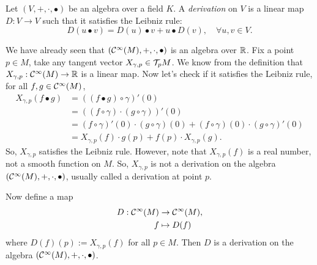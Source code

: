 \begin{definition}[Derivation]
	Let \((V, +, \cdot, \bullet)\) be an algebra over a field \(K\). A \emph{derivation} on \(V\) is a linear map \(D: V \to V\) such that it satisfies the Leibniz rule:
	\begin{equation}
		D(u \bullet v) = D(u) \bullet v + u \bullet D(v), \quad \forall u, v \in V.
	\end{equation}
\end{definition}
\begin{example}
	We have already seen that \((\mathcal C^\infty(M), +, \cdot, \bullet)\) is an algebra over \(\mathbb R\). Fix a point \(p \in M\), take any tangent vector \(X_{\gamma, p} \in \mathcal T_p M\). We know from the definition that \(X_{\gamma, p}: \mathcal C^\infty(M) \to \mathbb R\) is a linear map. Now let's check if it satisfies the Leibniz rule, for all \(f, g \in \mathcal C^\infty(M)\),
	\begin{align*}
		X_{\gamma, p}(f \bullet g) & = ((f \bullet g) \circ \gamma)'(0)                                                                \\
		                           & = ((f \circ \gamma) \cdot (g \circ \gamma))'(0)                                                   \\
		                           & = (f \circ \gamma)'(0) \cdot (g \circ \gamma)(0) + (f \circ \gamma)(0) \cdot (g \circ \gamma)'(0) \\
		                           & = X_{\gamma, p}(f) \cdot g(p) + f(p) \cdot X_{\gamma, p}(g).
	\end{align*}
	So, \(X_{\gamma, p}\) satisfies the Leibniz rule. However, note that \(X_{\gamma, p}(f)\) is a real number, not a smooth function on \(M\). So, \(X_{\gamma, p}\) is not a derivation on the algebra \((\mathcal C^\infty(M), +, \cdot, \bullet)\), usually called a derivation at point \(p\).

	Now define a map
	\begin{equation}
		\begin{aligned}
			D: \mathcal C^\infty(M) & \to \mathcal C^\infty(M), \\
			f                & \mapsto D(f)
		\end{aligned}
	\end{equation}
	where \(D(f)(p) := X_{\gamma, p}(f)\) for all \(p \in M\). Then \(D\) is a derivation on the algebra \((\mathcal C^\infty(M), +, \cdot, \bullet)\).
\end{example}

